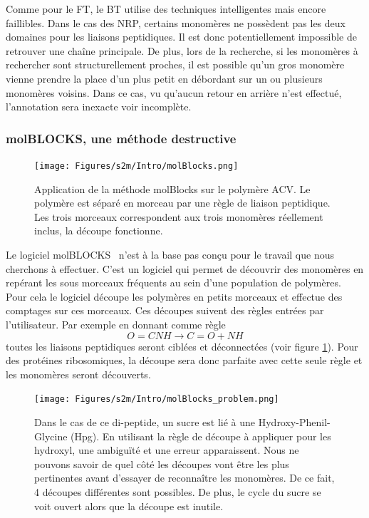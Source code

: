 Comme pour le FT, le BT utilise des techniques intelligentes mais encore faillibles.
Dans le cas des NRP, certains monomères ne possèdent pas les deux domaines pour les liaisons peptidiques.
Il est donc potentiellement impossible de retrouver une chaîne principale.
De plus, lors de la recherche, si les monomères à rechercher sont structurellement proches, il est possible qu'un gros monomère vienne prendre la place d'un plus petit en débordant sur un ou plusieurs monomères voisins.
Dans ce cas, vu qu'aucun retour en arrière n'est effectué, l'annotation sera inexacte voir incomplète.


\subsubsection{molBLOCKS, une méthode destructive}

\begin{figure}[!ht]
  \begin{center}
    \texttt{[image: Figures/s2m/Intro/molBlocks.png]}
    \caption{\label{molBlocks}Application de la méthode molBlocks sur le polymère ACV.
    Le polymère est séparé en morceau par une règle de liaison peptidique.
    Les trois morceaux correspondent aux trois monomères réellement inclus, la découpe fonctionne.}
  \end{center}
\end{figure}

Le logiciel molBLOCKS~\cite{ghersi_molblocks:_2014} n'est à la base pas conçu pour le travail que nous cherchons à effectuer.
C'est un logiciel qui permet de découvrir des monomères en repérant les sous morceaux fréquents au sein d'une population de polymères.
Pour cela le logiciel découpe les polymères en petits morceaux et effectue des comptages sur ces morceaux.
Ces découpes suivent des règles entrées par l'utilisateur.
Par exemple en donnant comme règle
\begin{equation}
  O=CNH \longrightarrow C=O + NH
\end{equation}
toutes les liaisons peptidiques seront ciblées et déconnectées (voir figure \ref{molBlocks}).
Pour des protéines ribosomiques, la découpe sera donc parfaite avec cette seule règle et les monomères seront découverts.

\begin{figure}[!ht]
  \begin{center}
    \texttt{[image: Figures/s2m/Intro/molBlocks\_problem.png]}
    \caption{\label{molBlocks_problem}Dans le cas de ce di-peptide, un sucre est lié à une Hydroxy-Phenil-Glycine (Hpg).
    En utilisant la règle de découpe à appliquer pour les hydroxyl, une ambiguïté et une erreur apparaissent.
    Nous ne pouvons savoir de quel côté les découpes vont être les plus pertinentes avant d'essayer de reconnaître les monomères.
    De ce fait, 4 découpes différentes sont possibles.
    De plus, le cycle du sucre se voit ouvert alors que la découpe est inutile.}
  \end{center}
\end{figure}

